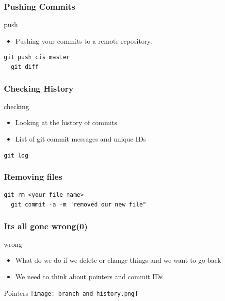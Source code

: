\documentclass{beamer}
\begin{document}

\begin{frame}[fragile]
  \frametitle{Pushing Commits}
  
  \begin{block}{push}
    \begin{itemize}  
      \item Pushing your commits to a remote repository.
    \end{itemize}
  \end{block}

  \begin{lstlisting}[caption=git push] 
  git push cis master
  git diff
  \end{lstlisting}
\end{frame}

\begin{frame}[fragile]
  \frametitle{Checking History}
  
  \begin{block}{checking}
    \begin{itemize}  
      \item Looking at the history of commits
      \item List of git commit messages and unique IDs
    \end{itemize}
  \end{block}

  \begin{lstlisting}[caption=git log] 
  git log
  \end{lstlisting}
\end{frame}


\begin{frame}[fragile]
  \frametitle{Removing files}
  
  \begin{lstlisting}[caption=Removing Files] 
  git rm <your file name>
  git commit -a -m "removed our new file"
  \end{lstlisting}

\end{frame}


\begin{frame}[fragile]
  \frametitle{Its all gone wrong(0)}

  \begin{block}{wrong}
   \begin{itemize}  
      \item What do we do if we delete or change things and we want to go back
      \item We need to think about pointers and commit IDs
    \end{itemize}
  \end{block}

  \begin{block}{Pointers}
    \texttt{[image: branch-and-history.png]}
  \end{block}


\end{frame}
\end{document}
